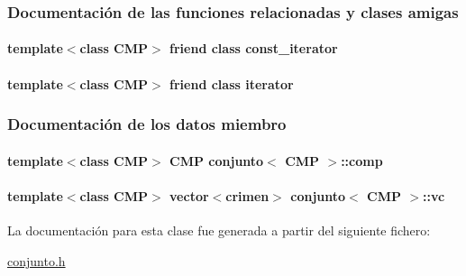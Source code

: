 \subsubsection{Documentación de las funciones relacionadas y clases amigas}
\hypertarget{classconjunto_ac220ce1c155db1ac44146c12d178056f}{
\paragraph[{const\-\_\-iterator}]{\setlength{\rightskip}{0pt plus 5cm}template$<$class C\-M\-P$>$ friend class {\bf const\-\_\-iterator}\hspace{0.3cm}{\ttfamily [friend]}}}\label{classconjunto_ac220ce1c155db1ac44146c12d178056f}
\hypertarget{classconjunto_a67171474c4da6cc8efe0c7fafefd2b2d}{
\paragraph[{iterator}]{\setlength{\rightskip}{0pt plus 5cm}template$<$class C\-M\-P$>$ friend class {\bf iterator}\hspace{0.3cm}{\ttfamily [friend]}}}\label{classconjunto_a67171474c4da6cc8efe0c7fafefd2b2d}


\subsubsection{Documentación de los datos miembro}
\hypertarget{classconjunto_af6b3ee8bd547ea0c444af56c5263adbe}{
\paragraph[{comp}]{\setlength{\rightskip}{0pt plus 5cm}template$<$class C\-M\-P$>$ C\-M\-P {\bf conjunto}$<$ C\-M\-P $>$\-::comp\hspace{0.3cm}{\ttfamily [private]}}}\label{classconjunto_af6b3ee8bd547ea0c444af56c5263adbe}
\hypertarget{classconjunto_a14cfd61d0d9f8e883d2b6042bb34c439}{
\paragraph[{vc}]{\setlength{\rightskip}{0pt plus 5cm}template$<$class C\-M\-P$>$ vector$<${\bf crimen}$>$ {\bf conjunto}$<$ C\-M\-P $>$\-::vc\hspace{0.3cm}{\ttfamily [private]}}}\label{classconjunto_a14cfd61d0d9f8e883d2b6042bb34c439}


La documentación para esta clase fue generada a partir del siguiente fichero\-:\begin{DoxyCompactItemize}
\item 
\hyperlink{conjunto_8h}{conjunto.\-h}\end{DoxyCompactItemize}
